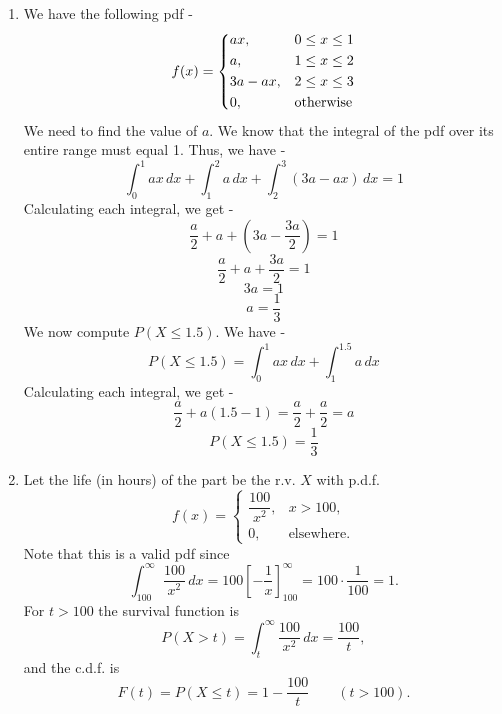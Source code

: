 \begin{enumerate}
\[\begin{cases}
    0 & x < 2 \\
    \frac{1}{36} & 2 \leq x < 3 \\
    \frac{3}{36} & 3 \leq x < 4 \\
    \frac{6}{36} & 4 \leq x < 5 \\
    \frac{10}{36} & 5 \leq x < 6 \\
    \frac{15}{36} & 6 \leq x < 7 \\
    \frac{21}{36} & 7 \leq x < 8 \\
    \frac{26}{36} & 8 \leq x < 9 \\
    \frac{30}{36} & 9 \leq x < 10 \\
    \frac{33}{36} & 10 \leq x < 11 \\
    \frac{35}{36} & 11 \leq x < 12 \\
    1 & x \geq 12
    \end{cases}
    \]
    \item We have the following pdf - \\
    $$f(x) = \begin{dcases}
        ax, & 0 \leq x \leq 1 \\
        a, & 1 \leq x \leq 2 \\
        3a - ax, & 2 \leq x \leq 3 \\
        0, & \text{otherwise}
\end{dcases}
$$
We need to find the value of $a$. We know that the integral of the pdf over its entire range must equal 1. Thus, we have -
\[\int_{0}^{1} ax \, dx + \int_{1}^{2} a \, dx + \int_{2}^{3} (3a - ax) \, dx = 1\]
Calculating each integral, we get -
\[\frac{a}{2} + a + \left(3a - \frac{3a}{2}\right) = 1\]
\[\frac{a}{2} + a + \frac{3a}{2} = 1\]
\[3a = 1\]  
\[\boxed{a = \frac{1}{3}
}\]
We now compute $P(X \leq 1.5)$. We have -
\[P(X \leq 1.5) = \int_{0}^{1} ax \, dx + \int_{1}^{1.5} a \, dx\]
Calculating each integral, we get -
\[\frac{a}{2} + a(1.5 - 1) = \frac{a}{2} + \frac{a}{2} = a\]
\[\boxed{P(X \leq 1.5) = \frac{1}{3}
}\]
\item Let the life (in hours) of the part be the r.v. \(X\) with p.d.f.
\[
f(x)=\begin{cases}
\dfrac{100}{x^{2}}, & x>100,\\[6pt]
0, & \text{elsewhere.}
\end{cases}
\]
Note that this is a valid pdf since
\[
\int_{100}^{\infty}\frac{100}{x^{2}}\,dx
=100\left[-\frac{1}{x}\right]_{100}^{\infty}
=100\cdot\frac{1}{100}=1.
\]
For \(t>100\) the survival function is
\[
P(X>t)=\int_{t}^{\infty}\frac{100}{x^{2}}\,dx=\frac{100}{t},
\]
and the c.d.f. is
\[
F(t)=P(X\le t)=1-\frac{100}{t}\qquad (t>100).
\]


\end{enumerate}
